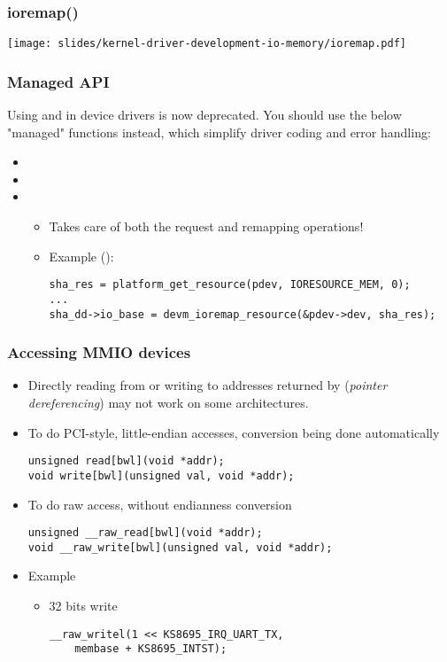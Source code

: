 \begin{frame}[fragile]
  \frametitle{ioremap()}
  \begin{center}
    \texttt{[image: slides/kernel-driver-development-io-memory/ioremap.pdf]}\\
  \end{center}
\end{frame}

\begin{frame}[fragile]
  \frametitle{Managed API}
  Using  and  in device
  drivers is now deprecated. You should use the below "managed"
  functions instead, which simplify driver coding and error handling:
  \begin{itemize}
  \item {}
  \item {}
  \item {}
        \begin{itemize}
	\item Takes care of both the request and remapping operations!
	\item Example ():
	\begin{block}{}
	\begin{verbatim}
sha_res = platform_get_resource(pdev, IORESOURCE_MEM, 0);
...
sha_dd->io_base = devm_ioremap_resource(&pdev->dev, sha_res);
	\end{verbatim}
	\end{block}{}
	\end{itemize}
  \end{itemize}
\end{frame}

\begin{frame}[fragile]
  \frametitle{Accessing MMIO devices}
  \begin{itemize}
  \item Directly reading from or writing to addresses returned by
     (\emph{pointer dereferencing}) may not work on some
    architectures.
  \item To do PCI-style, little-endian accesses, conversion being done
    automatically
\begin{verbatim}
unsigned read[bwl](void *addr);
void write[bwl](unsigned val, void *addr);
\end{verbatim}
  \item To do raw access, without endianness conversion
\begin{verbatim}
unsigned __raw_read[bwl](void *addr);
void __raw_write[bwl](unsigned val, void *addr);
\end{verbatim}
  \item Example
    \begin{itemize}
    \item 32 bits write
\begin{verbatim}
__raw_writel(1 << KS8695_IRQ_UART_TX,
    membase + KS8695_INTST);
\end{verbatim}
    \end{itemize}
  \end{itemize}
\end{frame}

